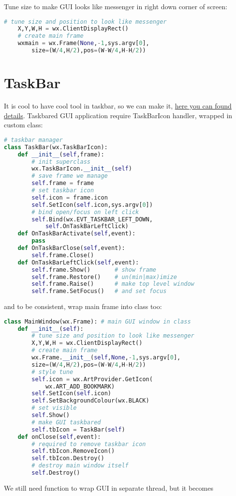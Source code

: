 Tune size to make GUI looks like messenger in right down corner of screen:
\begin{lstlisting}[language=python]
	# tune size and position to look like messenger
	X,Y,W,H = wx.ClientDisplayRect()
	# create main frame
	wxmain = wx.Frame(None,-1,sys.argv[0],
		size=(W/4,H/2),pos=(W-W/4,H-H/2))
\end{lstlisting}

\section{TaskBar}

It is cool to have cool tool in taskbar, so we can make it,
\href{http://www.blog.pythonlibrary.org/2013/07/12/wxpython-how-to-minimize-to-system-tray/}{here you can found details}.
Taskbared GUI application require TaskBarIcon handler, wrapped in custom class:
\begin{lstlisting}[language=python]
# taskbar manager
class TaskBar(wx.TaskBarIcon):	
	def __init__(self,frame):
		# init superclass
		wx.TaskBarIcon.__init__(self)
		# save frame we manage
		self.frame = frame
		# set taskbar icon
		self.icon = frame.icon
		self.SetIcon(self.icon,sys.argv[0])
		# bind open/focus on left click
		self.Bind(wx.EVT_TASKBAR_LEFT_DOWN,
			self.OnTaskBarLeftClick)
	def OnTaskBarActivate(self,event):
		pass
	def OnTaskBarClose(self,event):
		self.frame.Close()
	def OnTaskBarLeftClick(self,event):
		self.frame.Show()		# show frame
		self.frame.Restore()	# un(min|max)imize
		self.frame.Raise()		# make top level window
		self.frame.SetFocus()	# and set focus
\end{lstlisting}
and to be consistent, wrap main frame into class too:
\begin{lstlisting}[language=python]
class MainWindow(wx.Frame): # main GUI window in class
	def __init__(self):
		# tune size and position to look like messenger
		X,Y,W,H = wx.ClientDisplayRect()
		# create main frame
		wx.Frame.__init__(self,None,-1,sys.argv[0],
		size=(W/4,H/2),pos=(W-W/4,H-H/2))
		# style tune
		self.icon = wx.ArtProvider.GetIcon(
			wx.ART_ADD_BOOKMARK)
		self.SetIcon(self.icon)
		self.SetBackgroundColour(wx.BLACK)
		# set visible
		self.Show()
		# make GUI taskbared
		self.tbIcon = TaskBar(self)
	def onClose(self,event):
		# required to remove taskbar icon
		self.tbIcon.RemoveIcon()
		self.tbIcon.Destroy()
		# destroy main window itself
		self.Destroy()
\end{lstlisting}
We still need function to wrap GUI in separate thread, but it becomes
